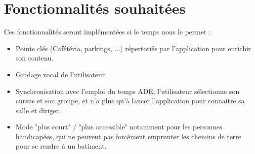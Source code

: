 \documentclass{report}
\begin{document}
	\section*{Fonctionnalités souhaitées}
	Ces fonctionnalités seront implémentées si le temps nous le permet :
	\begin{itemize}
		\item Points clés (Cafétéria, parkings, ...) répertoriés par l'application pour enrichir son contenu.
		\item Guidage vocal de l'utilisateur
		\item Synchronisation avec l'emploi du temps ADE, l'utilisateur sélectionne son cursus et son groupe, et n'a plus qu'à lancer l'application pour connaitre sa salle et diriger.
		\item Mode "plus court" / "plus accessible" notamment pour les personnes handicapées, qui ne peuvent pas forcément emprunter les chemins de terre pour se rendre à un batiment.
	\end{itemize}
	
\end{document}
